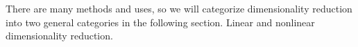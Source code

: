 There are many methods and uses, so we will categorize dimensionality reduction into two general categories in the following section. Linear and nonlinear dimensionality reduction.










